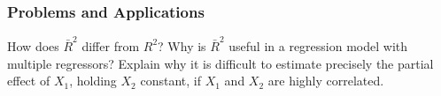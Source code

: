 

\begin{frame}
\frametitle{Problems and Applications}
How does $\bar{R}^{2}$ differ from $R^{2}$? Why is $\bar{R}^{2}$ useful in a regression model with multiple regressors?
\bigskip
{}
Explain why it is difficult to estimate precisely the partial effect of $X_1$, holding $X_2$ constant, if $X_1$ and $X_2$ are highly correlated.
\end{frame}

